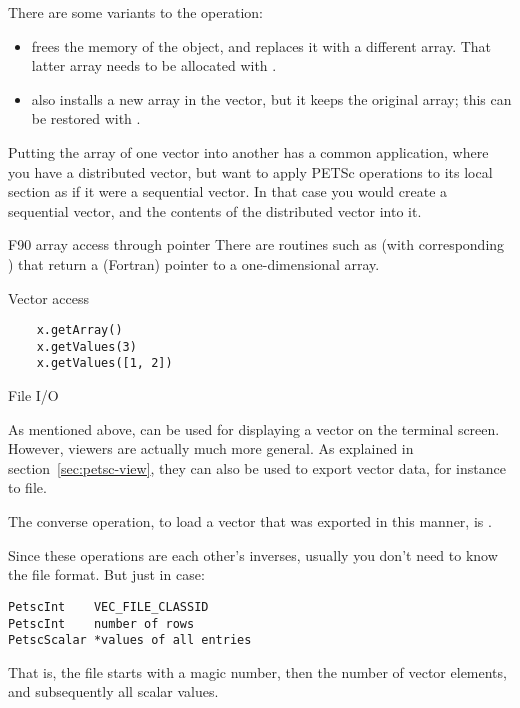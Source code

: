 There are some variants to the  operation:
\begin{itemize}
\item {} frees the memory of the
   object, and replaces it with a different array. That
  latter array needs to be allocated with
  .
\item {} also installs a new array in the
  vector, but it keeps the original array; this can be restored with
  .
\end{itemize}

Putting the array of one vector into another has a common application,
where you have a distributed vector, but want to apply PETSc operations
to its local section as if it were a sequential vector. In that case
you would create a sequential vector, and
 the contents of the distributed vector
into it.

\begin{fortrannote}{F90 array access through pointer}
  There are routines such as 
  (with corresponding )
  that
  return a (Fortran) pointer to a one-dimensional array.
\end{fortrannote}

\begin{pythonnote}{Vector access}
  \begin{lstlisting}
    x.getArray()
    x.getValues(3)
    x.getValues([1, 2])
  \end{lstlisting}
\end{pythonnote}

 {File I/O}
\label{sec:vecviewload}

As mentioned above,  can be used for
displaying a vector on the terminal screen.
However, viewers are actually much more general.
As explained in section~\ref{sec:petsc-view},
they can also be used to export vector data, for instance to file.

The converse operation, to load a vector that was exported in this manner,
is .

Since these operations are each other's inverses,
usually you don't need to know the file format.
But just in case:
\begin{lstlisting}
PetscInt    VEC_FILE_CLASSID
PetscInt    number of rows
PetscScalar *values of all entries
\end{lstlisting}
That is, the file starts with a magic number, then the number of vector elements,
and subsequently all scalar values.

